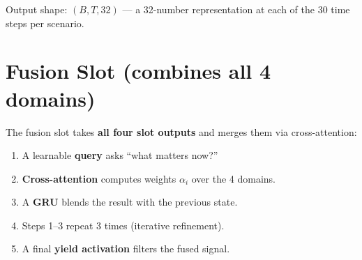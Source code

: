 \documentclass[12pt,a4paper]{article}
\begin{document}
Output shape: $(B, T, 32)$ — a 32-number representation at each of the 30 time steps per scenario.

\section{Fusion Slot (combines all 4 domains)}

The fusion slot takes \textbf{all four slot outputs} and merges them via cross-attention:

\begin{enumerate}[nosep]
  \item A learnable \textbf{query} asks ``what matters now?''
  \item \textbf{Cross-attention} computes weights $\alpha_i$ over the 4 domains.
  \item A \textbf{GRU} blends the result with the previous state.
  \item Steps 1--3 repeat 3 times (iterative refinement).
  \item A final \textbf{yield activation} filters the fused signal.
\end{enumerate}
\end{document}
